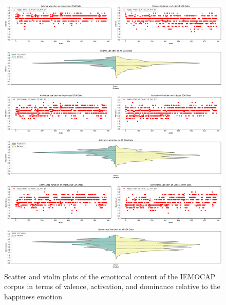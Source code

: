 \begin{figure}[H]
	\centering
	\includegraphics[width=1\linewidth]{figs/appendix/IEMOCAP_data_study/happyScatterViolins.png}
	\caption{Scatter and violin plots of the emotional content of the IEMOCAP corpus in terms of valence, activation, and dominance relative to the happiness emotion}
	\label{fig:happyScatterViolins}
\end{figure}


